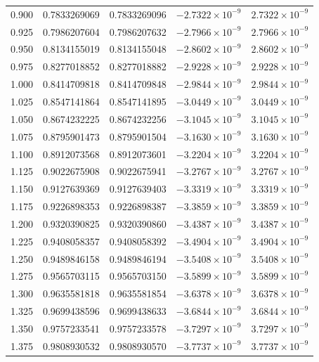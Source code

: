 \documentclass[11pt,a4paper]{article}
\begin{document}
\begin{longtable}{rrrrr}
0.900 & 0.7833269069 & 0.7833269096 & $-2.7322\times 10^{-9}$ & $2.7322\times 10^{-9}$ \\
0.925 & 0.7986207604 & 0.7986207632 & $-2.7966\times 10^{-9}$ & $2.7966\times 10^{-9}$ \\
0.950 & 0.8134155019 & 0.8134155048 & $-2.8602\times 10^{-9}$ & $2.8602\times 10^{-9}$ \\
0.975 & 0.8277018852 & 0.8277018882 & $-2.9228\times 10^{-9}$ & $2.9228\times 10^{-9}$ \\
1.000 & 0.8414709818 & 0.8414709848 & $-2.9844\times 10^{-9}$ & $2.9844\times 10^{-9}$ \\
1.025 & 0.8547141864 & 0.8547141895 & $-3.0449\times 10^{-9}$ & $3.0449\times 10^{-9}$ \\
1.050 & 0.8674232225 & 0.8674232256 & $-3.1045\times 10^{-9}$ & $3.1045\times 10^{-9}$ \\
1.075 & 0.8795901473 & 0.8795901504 & $-3.1630\times 10^{-9}$ & $3.1630\times 10^{-9}$ \\
1.100 & 0.8912073568 & 0.8912073601 & $-3.2204\times 10^{-9}$ & $3.2204\times 10^{-9}$ \\
1.125 & 0.9022675908 & 0.9022675941 & $-3.2767\times 10^{-9}$ & $3.2767\times 10^{-9}$ \\
1.150 & 0.9127639369 & 0.9127639403 & $-3.3319\times 10^{-9}$ & $3.3319\times 10^{-9}$ \\
1.175 & 0.9226898353 & 0.9226898387 & $-3.3859\times 10^{-9}$ & $3.3859\times 10^{-9}$ \\
1.200 & 0.9320390825 & 0.9320390860 & $-3.4387\times 10^{-9}$ & $3.4387\times 10^{-9}$ \\
1.225 & 0.9408058357 & 0.9408058392 & $-3.4904\times 10^{-9}$ & $3.4904\times 10^{-9}$ \\
1.250 & 0.9489846158 & 0.9489846194 & $-3.5408\times 10^{-9}$ & $3.5408\times 10^{-9}$ \\
1.275 & 0.9565703115 & 0.9565703150 & $-3.5899\times 10^{-9}$ & $3.5899\times 10^{-9}$ \\
1.300 & 0.9635581818 & 0.9635581854 & $-3.6378\times 10^{-9}$ & $3.6378\times 10^{-9}$ \\
1.325 & 0.9699438596 & 0.9699438633 & $-3.6844\times 10^{-9}$ & $3.6844\times 10^{-9}$ \\
1.350 & 0.9757233541 & 0.9757233578 & $-3.7297\times 10^{-9}$ & $3.7297\times 10^{-9}$ \\
1.375 & 0.9808930532 & 0.9808930570 & $-3.7737\times 10^{-9}$ & $3.7737\times 10^{-9}$ \\

\end{longtable}
\end{document}
